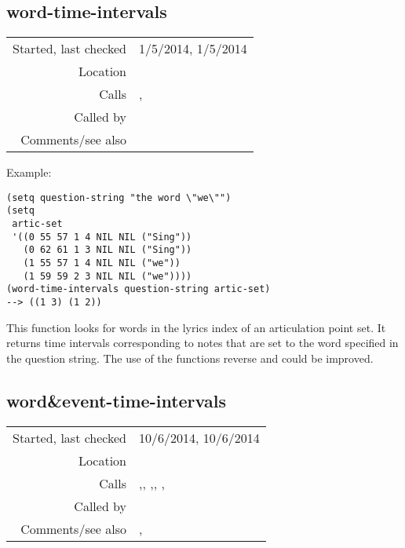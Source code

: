 \subsection*{word-time-intervals}\label{fun:word-time-intervals}

\vspace{0.3cm}
\begin{tabular}{r|p{8cm}}
Started, last checked & 1/5/2014, 1/5/2014 \\
Location & \nameref{sec:pitches-intervals-durations} \\
Calls & \nameref{fun:sort-dataset-asc}, \nameref{fun:string-separated-string2list} \\
Called by & \nameref{fun:Stravinsqi-Jun2014} \\
Comments/see also & \nameref{fun:word-and-event-time-intervals}
\end{tabular}

\vspace{0.5cm}
\noindent Example:
\begin{verbatim}
(setq question-string "the word \"we\"")
(setq
 artic-set
 '((0 55 57 1 4 NIL NIL ("Sing"))
   (0 62 61 1 3 NIL NIL ("Sing"))
   (1 55 57 1 4 NIL NIL ("we"))
   (1 59 59 2 3 NIL NIL ("we"))))
(word-time-intervals question-string artic-set)
--> ((1 3) (1 2))
\end{verbatim}

\noindent This function looks for words in the lyrics
index of an articulation point set. It returns time
intervals corresponding to notes that are set to the
word specified in the question string. The use of the
functions reverse and 
could be improved.


\subsection*{word\&event-time-intervals}\label{fun:word-and-event-time-intervals}

\vspace{0.3cm}
\begin{tabular}{r|p{8cm}}
Started, last checked & 10/6/2014, 10/6/2014 \\
Location & \nameref{sec:pitches-intervals-durations} \\
Calls & \nameref{fun:duration-time-intervals},\newline \nameref{fun:duration-n-pitch-class-time-intervals}, \nameref{fun:intersection-multidimensional},\newline \nameref{fun:pitch-class-time-intervals}, \nameref{fun:replace-all},\newline \nameref{fun:string-separated-string2list} \\
Called by & \nameref{fun:Stravinsqi-Jun2014} \\
Comments/see also & \nameref{fun:articulation-and-event-time-intervals},\newline \nameref{fun:word-time-intervals}
\end{tabular}


